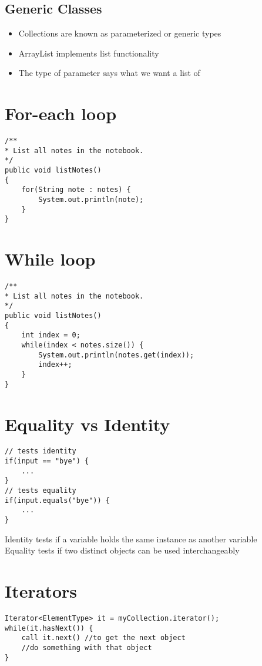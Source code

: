 \documentclass{article}[18pt]
\begin{document}
\subsection{Generic Classes}
\begin{itemize}
	\item Collections are known as parameterized or generic types
	\item ArrayList implements list functionality
	\item The type of parameter says what we want a list of
\end{itemize}
\section{For-each loop}
\begin{verbatim}
/**
* List all notes in the notebook.
*/
public void listNotes()
{
	for(String note : notes) {
		System.out.println(note);
	}
} 
\end{verbatim}
\section{While loop}
\begin{verbatim}
/**
* List all notes in the notebook.
*/
public void listNotes()
{
	int index = 0;
	while(index < notes.size()) {
		System.out.println(notes.get(index));
		index++;
	}
} 
\end{verbatim}
\section{Equality vs Identity}
\begin{verbatim}
// tests identity
if(input == "bye") {		
	...
}
// tests equality
if(input.equals("bye")) {
	...
}
\end{verbatim}
Identity tests if a variable holds the same instance as another variable\\
Equality tests if two distinct objects can be used interchangeably
\section{Iterators}
\begin{verbatim}
Iterator<ElementType> it = myCollection.iterator();
while(it.hasNext()) {
	call it.next() //to get the next object
	//do something with that object
} 
\end{verbatim}
\newpage
\end{document}
